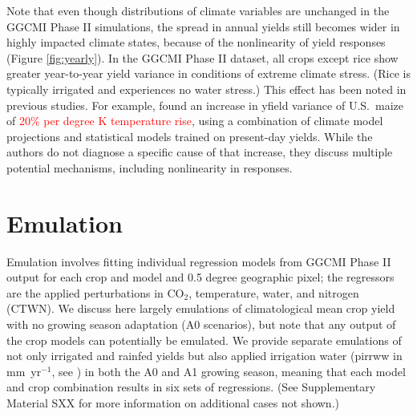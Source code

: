\documentclass[gmd, manuscript]{copernicus} %
\begin{document}
Note that even though distributions of climate variables are unchanged in the GGCMI Phase II simulations, the spread in annual yields still becomes wider in highly impacted climate states, because of the nonlinearity of yield responses (Figure \ref{fig:yearly}). 
In the GGCMI Phase II dataset, all crops except rice show  greater year-to-year yield variance  in conditions of extreme climate stress. %
(Rice is typically irrigated and experiences no water stress.) 
This effect has been noted in previous studies. For example, \cite{Urban2012} found an increase in yfield variance of U.S.\ maize of \textcolor{red}{20\% per degree K temperature rise}, using a combination of climate model projections and statistical models trained on present-day yields. While the authors do not diagnose a specific cause of that increase, they discuss multiple potential mechanisms, including nonlinearity in responses. 


\section{Emulation}
\label{S:3}
Emulation involves fitting individual regression models from GGCMI Phase II output for each crop and model and 0.5 degree geographic pixel; the regressors are the applied perturbations in CO$_2$, temperature, water, and nitrogen (CTWN). 
We discuss here largely emulations of climatological mean crop yield with no growing season adaptation (A0 scenarios), but note that any output of the crop models can potentially be emulated. 
We provide separate emulations of not only irrigated and rainfed yields but also applied irrigation water (pirrww in mm\ yr$^{-1}$, see \citep{Franke2019a}) in both the A0 and A1 growing season, meaning that each model and crop combination results in six sets of regressions. (See Supplementary Material SXX for more information on additional cases not shown.)
\end{document}
